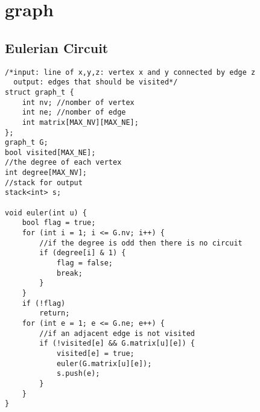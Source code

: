 \section{graph}
\subsection{Eulerian Circuit}
\begin{lstlisting}
/*input: line of x,y,z: vertex x and y connected by edge z
  output: edges that should be visited*/
struct graph_t {
    int nv; //nomber of vertex
    int ne; //nomber of edge
    int matrix[MAX_NV][MAX_NE];
};
graph_t G;
bool visited[MAX_NE];
//the degree of each vertex
int degree[MAX_NV];    
//stack for output
stack<int> s;

void euler(int u) {
    bool flag = true;
    for (int i = 1; i <= G.nv; i++) {
        //if the degree is odd then there is no circuit
        if (degree[i] & 1) {
            flag = false;
            break;
        }
    }
    if (!flag)
    	return;    
    for (int e = 1; e <= G.ne; e++) {
    	//if an adjacent edge is not visited
        if (!visited[e] && G.matrix[u][e]) {
            visited[e] = true;
            euler(G.matrix[u][e]);
            s.push(e);
        }
    }
}
\end{lstlisting}
